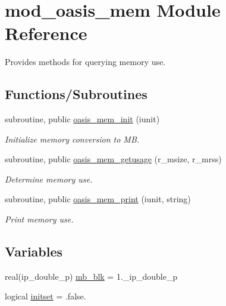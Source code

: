 \hypertarget{namespacemod__oasis__mem}{}\section{mod\+\_\+oasis\+\_\+mem Module Reference}
\label{namespacemod__oasis__mem}


Provides methods for querying memory use.  


\subsection*{Functions/\+Subroutines}
\begin{DoxyCompactItemize}
\item 
subroutine, public \hyperlink{namespacemod__oasis__mem_a104b7e7e85cd79e731a6e12a14358bbb}{oasis\+\_\+mem\+\_\+init} (iunit)
\begin{DoxyCompactList}\small\item\em Initialize memory conversion to MB. \end{DoxyCompactList}\item 
subroutine, public \hyperlink{namespacemod__oasis__mem_a2e20a40b48c7a7572f72da1b5d109ce3}{oasis\+\_\+mem\+\_\+getusage} (r\+\_\+msize, r\+\_\+mrss)
\begin{DoxyCompactList}\small\item\em Determine memory use. \end{DoxyCompactList}\item 
subroutine, public \hyperlink{namespacemod__oasis__mem_ac628b504553edbe9345cd070a8db2634}{oasis\+\_\+mem\+\_\+print} (iunit, string)
\begin{DoxyCompactList}\small\item\em Print memory use. \end{DoxyCompactList}\end{DoxyCompactItemize}
\subsection*{Variables}
\begin{DoxyCompactItemize}
\item 
real(ip\+\_\+double\+\_\+p) \hyperlink{namespacemod__oasis__mem_a7c262f1c120ed57d527ee3de91552ee9}{mb\+\_\+blk} = 1.\+\_\+ip\+\_\+double\+\_\+p
\item 
logical \hyperlink{namespacemod__oasis__mem_aad83c95e1a17a31825eb9c4e1c663aa1}{initset} = .false.
\end{DoxyCompactItemize}



